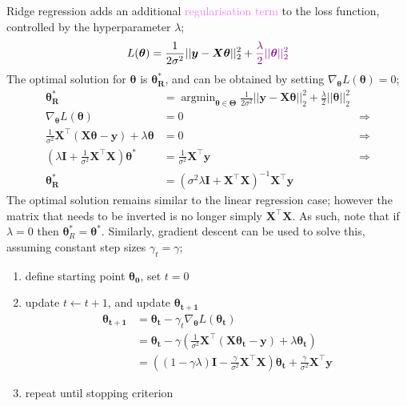 \documentclass[a4paper, 12pt]{article}
\newcommand{\mat}[1]{\boldsymbol{#1}}
\DeclareMathOperator*{\argmin}{argmin}
\newcommand{\violet}[1]{\textcolor{violet}{#1}}
\begin{document}
                Ridge regression adds an additional \violet{regularisation term} to the loss function, controlled by the hyperparameter $\lambda$;
                $$L(\mat{\theta}) = \frac{1}{2 \sigma^2} || \mat{y} - \mat{X}\mat{\theta} ||_2^2 + \violet{\frac{\lambda}{2} || \mat{\theta} ||_2^2}$$
                The optimal solution for $\mat{\theta}$ is $\mat{\theta_R^*}$, and can be obtained by setting $\nabla_{\mat{\theta}}L(\mat{\theta}) = 0$;
                \begin{align*}
                    \mat{\theta_R^*} & = \argmin_{\mat{\theta} \in \mat{\Theta}} \frac{1}{2\sigma^2} || \mat{y} - \mat{X}\mat{\theta} ||_2^2 + \frac{\lambda}{2} || \mat{\theta} ||_2^2 \\
                    \nabla_{\mat{\theta}}L(\mat{\theta}) & = 0 & \Rightarrow \\
                    \frac{1}{\sigma^2} \mat{X}^\top(\mat{X}\mat{\theta} - \mat{y}) + \lambda\mat{\theta} & = 0 & \Rightarrow \\
                    \left(\lambda\mat{I} + \frac{1}{\sigma^2} \mat{X}^\top\mat{X}\right) \mat{\theta^*} & = \frac{1}{\sigma^2} \mat{X}^\top\mat{y} & \Rightarrow \\
                    \mat{\theta_R^*} & = (\sigma^2\lambda \mat{I} + \mat{X}^\top\mat{X})^{-1}\mat{X}^\top\mat{y}
                \end{align*}
                The optimal solution remains similar to the linear regression case; however the matrix that needs to be inverted is no longer simply $\mat{X}^\top\mat{X}$.
                As such, note that if $\lambda = 0$ then $\mat{\theta}_R^* = \mat{\theta^*}$.
                Similarly, gradient descent can be used to solve this, assuming constant step sizes $\gamma_t = \gamma$;
                \begin{enumerate}
                    \itemsep0em
                    \item define starting point $\mat{\theta_0}$, set $t = 0$
                    \item update $t \leftarrow t + 1$, and update $\mat{\theta_{t + 1}}$
                        \begin{align*}
                            \mat{\theta_{t + 1}} & = \mat{\theta_t} - \gamma_t \nabla_{\mat{\theta}}L(\mat{\theta_t}) \\
                            & = \mat{\theta_t} - \gamma \left(\frac{1}{\sigma^2} \mat{X}^\top(\mat{X}\mat{\theta_t} - \mat{y}) + \lambda\mat{\theta_t}\right) \\
                            & = \left((1 - \gamma\lambda) \mat{I} - \frac{\gamma}{\sigma^2} \mat{X}^\top\mat{X}\right)\mat{\theta_t} + \frac{\gamma}{\sigma^2} \mat{X}^\top\mat{y}
                        \end{align*}
                    \item repeat until stopping criterion
                \end{enumerate}
\end{document}
